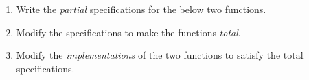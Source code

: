 \documentclass[oneside,11pt,dvipsnames]{book}
\newcommand{\sol}[1]{\iftoggle{usesol}{\textbf{Sol:} #1}{}}
\newcommand{\code}[1]{\texttt{#1}}
\begin{document}
\begin{enumerate}
    \item Write the \emph{partial} specifications for the below two functions.
    
    \sol {
        \begin{itemize}
            \item \code{divide}:
                \begin{itemize}
                    \item PRE: \code{b} must be non-zero
                    \item POST: returns the result of dividing \code{a} by \code{b}
                \end{itemize}
            \item \code{get\_average}:
                \begin{itemize}
                    \item PRE: \code{numbers} must be non-empty
                    \item POST: returns the average of the numbers in the list
                \end{itemize}
        \end{itemize}
    }
    \item Modify the specifications to make the functions \emph{total}.

    \sol {
        \begin{itemize}
            \item \code{divide}:
                \begin{itemize}
                    \item PRE: True
                    \item POST: 
                        \begin{itemize}
                            \item if \code{b} is 0, raise an exception
                            \item returns the result of dividing \code{a} by \code{b}
                        \end{itemize}
                \end{itemize}
            \item \code{get\_average}:
                \begin{itemize}
                    \item PRE: True
                    \item POST: 
                        \begin{itemize}
                            \item if \code{numbers} is empty, raise an exception
                            \item returns the average of the numbers in the list
                        \end{itemize}
                \end{itemize}
        \end{itemize}
    }
    \item Modify the \emph{implementations} of the two functions to satisfy the total specifications.
\end{enumerate}
\end{document}
